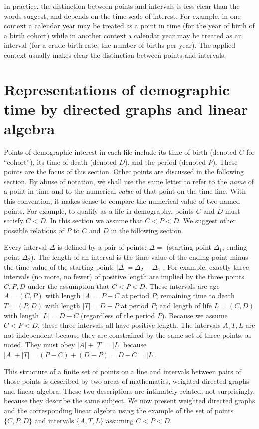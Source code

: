 \documentclass{bmcart}
\begin{document}
In practice,
the distinction between points and intervals is less clear than the words suggest, and 
depends on the time-scale of interest.
For example, in one context a calendar year may be treated as a point in time (for the year of birth of a birth cohort) 
while in another context a calendar year may be treated as an interval (for a crude birth rate, the number of births per year).
The applied context usually makes clear the distinction between points and intervals.

\section*{Representations of demographic time by directed graphs and linear algebra}

Points of demographic interest in each life include its time of birth 
(denoted $C$ for ``cohort''), its time of death (denoted $D$), and the period (denoted $P$).
These points are the focus of this section.
Other points are discussed in the following section.
By abuse of notation, we shall use the same letter to refer to the \emph{name}
of a point in time and to the numerical \emph{value} of that point on the time line.
With this convention,
it makes sense to compare the numerical value of two named points. 
For example, to qualify as a life in demography, points $C$ and $D$ must satisfy $C < D$.
In this section we assume that $C<P<D$.
We suggest other possible relations of $P$ to $C$ and $D$ in the following section.




Every interval $\Delta$ is defined by a pair of points: $\Delta =$ (starting point $\Delta_1$, ending point $\Delta_2$). 
The length of an interval is the time value of the 
ending point minus the time value of the starting point: $|\Delta| =\Delta_2 - \Delta_1$ .
For example, exactly three intervals (no more, no fewer) of positive length are implied by the three points $C, P, D$ under the assumption that $C<P<D$. 
These intervals are age $A=(C,P)$ with length $|A|=P-C$ at period $P$; 
remaining time to death $T=(P,D)$ with length $|T|=D-P$ at period $P$; 
and length of life $L=(C,D)$ with length $|L|=D-C$ (regardless of the period $P$).
Because we assume $C<P<D$, these three intervals all have positive length.
The intervals $A,T,L$ are not independent because they are constrained by the same set of three points,
as \citet{riffe2017demographictime} noted.
They must obey $|A|+|T|=|L|$
because $|A|+|T|=(P-C)+(D-P)=D-C=|L|$.


This structure of a finite set of points on a line and intervals between pairs of those points
is described by two areas of mathematics, weighted directed graphs and linear algebra. 
These two descriptions are intimately related, not surprisingly, because they describe the same subject.
We now present weighted directed graphs and the corresponding linear algebra using the example of the
set of points $\{C,P,D\}$ and intervals $\{A,T,L\}$ assuming $C<P<D$.
\end{document}
